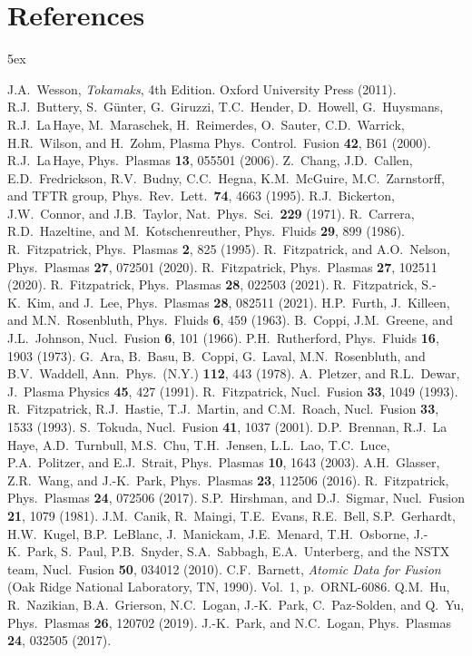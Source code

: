 \documentclass[12pt,prb,aps]{revtex4-1}
\begin{document}
\section*{References}
\begin{thebibliography}{99}\baselineskip 5ex

 J.A.~Wesson, {\em Tokamaks}, 4th Edition. Oxford University Press (2011).
 R.J.~Buttery, S.~G\"{u}nter, G.~Giruzzi, T.C.~Hender, D.~Howell,
G.~Huysmans, R.J.~La\,Haye, M.~Maraschek, H.~Reimerdes, O.~Sauter,
C.D.~Warrick, H.R.~Wilson, and H.~Zohm, Plasma Phys.\ Control.\ Fusion
{\bf 42}, B61 (2000). 
 R.J.~La\,Haye, Phys.\ Plasmas {\bf 13}, 055501 (2006). 
 Z.~Chang, J.D.~Callen, E.D.~Fredrickson, R.V.~Budny, C.C.~Hegna, K.M.~McGuire, M.C.~Zarnstorff, and TFTR group, 
Phys.\ Rev.\ Lett.\ {\bf 74}, 4663 (1995).
 R.J.~Bickerton, J.W.~Connor, and J.B.~Taylor, Nat.\ Phys.\ Sci.\ {\bf 229} (1971).
 R.~Carrera, R.D.~Hazeltine, and M.~Kotschenreuther, Phys.\ Fluids {\bf 29},
899 (1986). 
 R.~Fitzpatrick, Phys.\ Plasmas {\bf 2}, 825 (1995).
 R.~Fitzpatrick, and A.O.~Nelson, Phys.\ Plasmas {\bf 27}, 072501 (2020).
 R.~Fitzpatrick, Phys.\ Plasmas {\bf 27}, 102511 (2020).
 R.~Fitzpatrick, Phys.\ Plasmas {\bf 28}, 022503 (2021).
 R.~Fitzpatrick, S.-K.~Kim, and J.~Lee, Phys.\ Plasmas {\bf 28}, 082511 (2021).
 H.P.~Furth,  J.~Killeen, and M.N.~Rosenbluth,  Phys.\ Fluids {\bf 6}, 459 (1963).
 B.~Coppi, J.M.~Greene, and J.L.~Johnson, Nucl.\ Fusion {\bf 6}, 101 (1966).
 P.H.~Rutherford,  Phys.\ Fluids  {\bf 16}, 1903 (1973).
 G.~Ara,  B.~Basu, B.~Coppi, G.~Laval, M.N.~Rosenbluth, and B.V.~Waddell, Ann.\ Phys.\ (N.Y.) {\bf 112}, 443 (1978). 
 A.~Pletzer, and R.L.~Dewar, J.\ Plasma Physics {\bf 45}, 427 (1991).
 R.~Fitzpatrick, Nucl.\ Fusion {\bf 33}, 1049 (1993).
 R.~Fitzpatrick, R.J.~Hastie, T.J.~Martin, and C.M.~Roach, Nucl.\ Fusion {\bf 33}, 1533 (1993).
 S.~Tokuda, Nucl.\ Fusion {\bf 41}, 1037 (2001).
 D.P.~Brennan, R.J.~La Haye, A.D.~Turnbull, M.S.~Chu, T.H.~Jensen, L.L.~Lao, T.C.~Luce, P.A.~Politzer, and E.J.~Strait,
Phys.\ Plasmas {\bf 10}, 1643 (2003).
 A.H.~Glasser, Z.R.~Wang, and J.-K.~Park, Phys.\ Plasmas {\bf 23}, 112506 (2016).
 R.~Fitzpatrick, Phys.\ Plasmas {\bf 24}, 072506 (2017). 
 S.P.~Hirshman, and D.J.~Sigmar,   Nucl.\ Fusion {\bf 21}, 1079 (1981).
 J.M.~Canik, R.~Maingi, T.E.~Evans, R.E.~Bell, S.P.~Gerhardt, H.W.~Kugel, B.P.~LeBlanc, 
J.~Manickam, J.E.~Menard,
T.H.~Osborne, J.-K.~Park, S.~Paul, P.B.~Snyder, S.A.~Sabbagh, E.A.~Unterberg, and the NSTX team, 
Nucl.\ Fusion {\bf 50}, 034012 (2010). 
 C.F.~Barnett, {\em Atomic Data for Fusion} (Oak Ridge National Laboratory, TN, 1990). Vol.~1, p.~ORNL-6086. 
 Q.M.~Hu, R.~Nazikian, B.A.~Grierson, N.C.~Logan, J.-K.~Park, C.~Paz-Solden, and Q.~Yu, Phys.\
Plasmas {\bf 26}, 120702 (2019). 
 J.-K.~Park, and N.C.~Logan, Phys.\ Plasmas {\bf 24}, 032505 (2017).


\end{thebibliography}
\end{document}
